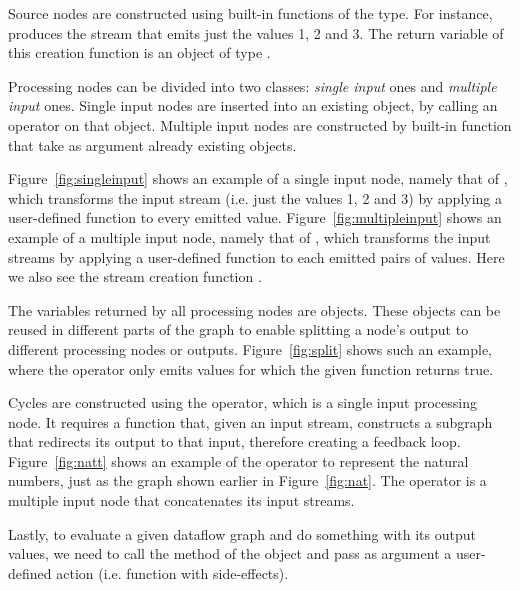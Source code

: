 \documentclass[sigplan,screen,10pt]{acmart}
\begin{document}
Source nodes are constructed using built-in functions of the  type.
For instance,  produces the stream that emits just
the values 1, 2 and 3. The return variable of this creation function is an
object of type .

Processing nodes can be divided into two classes: \textit{single input} ones and
\textit{multiple input} ones.
%
Single input nodes are inserted into an existing  object, by
calling an operator on that object.
Multiple input nodes are constructed by built-in function that take as
argument already existing  objects.

%
%
Figure~\ref{fig:singleinput} shows an
example of a single input node, namely that of , which transforms
the input stream (i.e. just the values 1, 2 and 3) by applying a user-defined
function to every emitted value.
%
Figure~\ref{fig:multipleinput} shows
an example of a multiple input node, namely that of , which
transforms the input streams by
applying a user-defined function to each emitted pairs of values.
Here we also see the stream creation function .
%

The variables returned by all processing nodes are  objects. These
objects can be reused in different parts of the graph to enable splitting a
node's output to different processing nodes or outputs. Figure~\ref{fig:split}
shows such an example, where the  operator only emits values for
which the given function returns true.

Cycles are constructed using the  operator, which is a single
input processing node. It requires a function that, given an input stream,
constructs a subgraph that redirects its output to that input, therefore
creating a feedback loop. Figure~\ref{fig:natt} shows an example of the
 operator to represent the natural numbers, just as the graph
shown earlier in Figure~\ref{fig:nat}. The  operator is a
multiple input node that concatenates its input streams.


Lastly, to evaluate a given dataflow graph and do something with its output values, we
need to call the  method of the  object and pass as argument
a user-defined action (i.e. function with side-effects).
%
\end{document}
